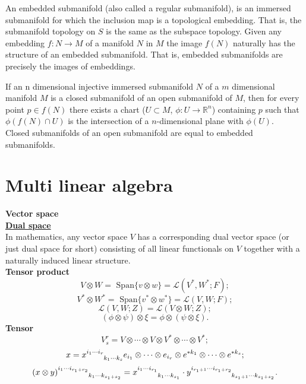 \begin{newdef}
An embedded submanifold (also called a regular submanifold), is an immersed submanifold for which the inclusion map is a topological embedding. That is, the submanifold topology on $S$ is the same as the subspace topology. Given any embedding $f:N \to M$ of a manifold $N$ in $M$ the image $f(N)$ naturally has the structure of an embedded submanifold. That is, embedded submanifolds are precisely the images of embeddings.
\end{newdef}

\begin{newprop}[]
If an n dimensional injective immersed submanifold $N$ of a $m$ dimensional manifold $M$ is a closed submanifold of an open submanifold of $M$, then for every point $p \in f(N)$ there exists a chart ($U \subset M$, $\phi:U \to \mathbb{R}^n $) containing $p$ such that $\phi(f(N) \cap U)$ is the intersection of a $n$-dimensional plane with $\phi(U)$.\\
Closed submanifolds of an open submanifold are equal to embedded submanifolds.
\end{newprop}

\section{Multi linear algebra}
\begin{newdef}[Tensor]
\textbf{Vector space}\\
\href{https://en.wikipedia.org/wiki/Dual_space}{\textbf{Dual space}}\\
In mathematics, any vector space $V$ has a corresponding dual vector space (or just dual space for short) consisting of all linear functionals on $V$ together with a naturally induced linear structure.\\
\textbf{Tensor product}
\[V \otimes W = \mbox{ Span}\{ v \otimes w \} = \mathcal{L}(V^*,W^*;F);\]
\[V^* \otimes W^* = \mbox{ Span}\{ v^* \otimes w^* \} = \mathcal{L}(V,W;F);\]
\[\mathcal{L}(V,W;Z)=\mathcal{L}(V \otimes W;Z);\]
\[(\phi \otimes \psi)\otimes \xi = \phi \otimes (\psi \otimes \xi).\]
\textbf{Tensor}
\[V_s^r = V \otimes \cdots \otimes V \otimes V^* \otimes \cdots \otimes V^*;\]
\[x=\tensor{x}{^{i_1 \cdots i_r}_{k_1 \cdots k_s}} e_{i_1} \otimes \cdots \otimes e_{i_r} \otimes e^{*k_1} \otimes \cdots \otimes e^{*k_s};\]
\[\tensor{(x \otimes y)}{^{i_1 \cdots i_{r_1+r_2}}_{k_1 \cdots k_{s_1+s_2}}} = 
\tensor{x}{^{i_1 \cdots i_{r_1}}_{k_1 \cdots k_{s_1}}} \cdot \tensor{y}{^{i_{r_1+1} \cdots i_{r_1+r_2}}_{k_{s_1+1} \cdots k_{s_1+s_2}}}.\]
\end{newdef}


